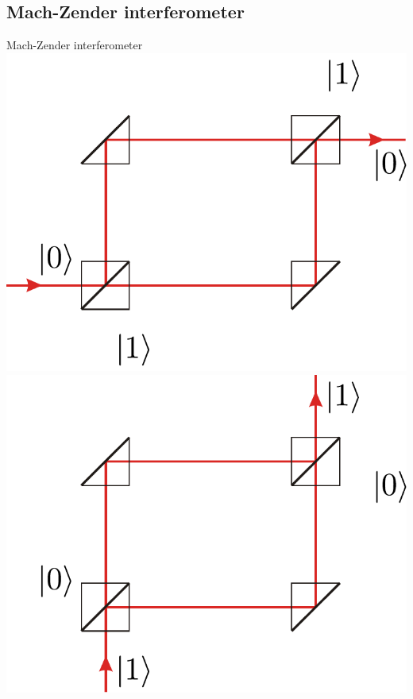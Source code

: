 \subsection{Mach-Zender interferometer}
\begin{frame}[allowframebreaks]{Mach-Zender interferometer}
    \newlength{\wdth}
    \centering
    \setlength{\wdth}{0.5\textwidth}
    \includegraphics[width=\wdth]{pics/bombs/Mach-Zehnder_interferometer_k0}\\
    \includegraphics[width=\wdth]{pics/bombs/Mach-Zehnder_interferometer_k1}\\

\end{frame}
